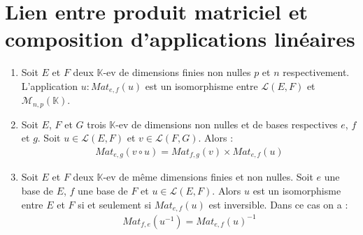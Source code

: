 \documentclass[../main.tex]{subfiles}
\begin{document}
\section{Lien entre produit matriciel et composition d'applications linéaires}
\begin{tcolorbox}[title=Théorème 28.21, title filled=false, colframe=orange, colback=orange!10!white]
    \begin{enumerate}
        \item Soit $E$ et $F$ deux $\mathbb{K}$-ev de dimensions finies non nulles $p$ et $n$ respectivement. L'application $u:Mat_{e,f}(u)$ est un isomorphisme entre $\mathcal{L}(E, F)$  et $\mathcal{M}_{n,p}(\mathbb{K})$.
        \item Soit $E$, $F$ et $G$ trois $\mathbb{K}$-ev de dimensions non nulles et de bases respectives $e$, $f$ et $g$. Soit $u\in \mathcal{L}(E, F)$ et $v\in \mathcal{L}(F, G)$. Alors : 
        \begin{align*}
            Mat_{e,g}(v\circ u) = Mat_{f,g}(v) \times Mat_{e,f}(u)
        \end{align*}
        \item Soit $E$ et $F$ deux $\mathbb{K}$-ev de même dimensions finies et non nulles. Soit $e$ une base de $E$, $f$ une base de $F$ et $u\in \mathcal{L}(E, F)$. Alors $u$ est un isomorphisme entre $E$ et $F$ si et seulement si $Mat_{e,f}(u)$ est inversible. Dans ce cas on a :
        \begin{align*}
            Mat_{f,e}(u^{-1}) = Mat_{e,f}(u)^{-1}
        \end{align*}
    \end{enumerate}
\end{tcolorbox}
\end{document}
